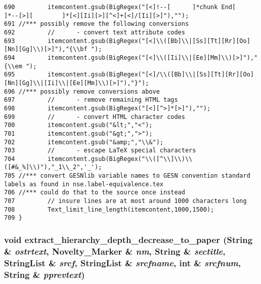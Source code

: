 \begin{verbatim}
690         itemcontent.gsub(BigRegex("[<]!--[      ]*chunk End[    ]*--[>][        ]*[<][Ii][>][^<]+[<]/[Ii][>]"),"");
691 //*** possibly remove the following conversions
692         //      - convert text attribute codes
693         itemcontent.gsub(BigRegex("[<]\\([Bb]\\|[Ss][Tt][Rr][Oo][Nn][Gg]\\)[>]"),"{\\bf ");
694         itemcontent.gsub(BigRegex("[<]\\([Ii]\\|[Ee][Mm]\\)[>]"),"{\\em ");
695         itemcontent.gsub(BigRegex("[<]/\\([Bb]\\|[Ss][Tt][Rr][Oo][Nn][Gg]\\|[Ii]\\|[Ee][Mm]\\)[>]"),"}");
696 //*** possibly remove conversions above
697         //      - remove remaining HTML tags
698         itemcontent.gsub(BigRegex("[<][^>]*[>]"),"");
699         //      - convert HTML character codes
700         itemcontent.gsub("&lt;","<");
701         itemcontent.gsub("&gt;",">");
702         itemcontent.gsub("&amp;","\\&");
703         //      - escape LaTeX special characters
704         itemcontent.gsub(BigRegex("\\([^\\]\\)\\([#&_%]\\)"),"_1\\_2",'_');
705 //*** convert GESNlib variable names to GESN convention standard labels as found in nse.label-equivalence.tex
706 //*** could do that to the source once instead
707         // insure lines are at most around 1000 characters long
708         Text_limit_line_length(itemcontent,1000,1500);
709 }
\end{verbatim}\normalsize 
{}
\subsubsection{\setlength{\rightskip}{0pt plus 5cm}void extract\_\-hierarchy\_\-depth\_\-decrease\_\-to\_\-paper ({\bf String} \& {\em ostrtext}, {\bf Novelty\_\-Marker} \& {\em nm}, {\bf String} \& {\em sectitle}, {\bf String\-List} \& {\em srcf}, {\bf String\-List} \& {\em srcfname}, int \& {\em srcfnum}, {\bf String} \& {\em pprevtext})}\label{ppfilter_8cc_a10}




